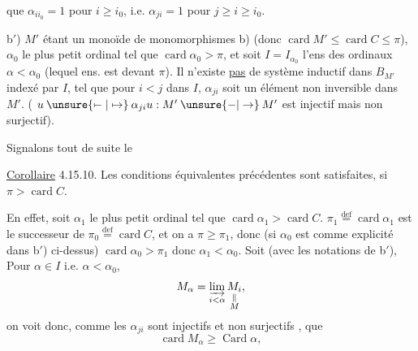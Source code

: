 
que $\alpha_{ii_0}=1$ pour $i\geq i_0$, i.e. $\alpha_{ji}=1$ pour $j\geq i\geq i_0$.

b$'$) $M'$ étant un monoïde de monomorphismes  b) (donc $\operatorname{card} M'\leq\operatorname{card} C\leq\pi$),   $\alpha_0$ le plus petit ordinal  tel que $\operatorname{card}\alpha_0>\pi$, et soit $I=I_{\alpha_0}$ l'ens  des ordinaux $\alpha<\alpha_0$ (lequel ens. est  devant $\pi$).
 Il n'existe \uline{pas} de système inductif dans $B_{M'}$ indexé par $I$, tel que  pour $i<j$ dans $I$, $\alpha_{ji}$ soit un élément non inversible dans $M'$.
( $u\mathbin{\unsure{\mapstochar\relbar|\mapsto}}\alpha_{ji}u:M'\mathbin{\unsure{-|\to}}M'$ est injectif mais non surjectif).

Signalons tout de suite le 

\uline{Corollaire} 4.15.10. Les conditions équivalentes précédentes sont satisfaites, si $\pi>\operatorname{card} C$.

En effet, soit $\alpha_1$ le  plus petit ordinal tel que $\operatorname{card}\alpha_1>\operatorname{card} C$.   $\pi_1\overset{\mathrm{def}}{=}\operatorname{card}\alpha_1$  est le successeur de $\pi_0\overset{\mathrm{def}}{=}\operatorname{card} C$, et on a $\pi\geq\pi_1$, donc  (si $\alpha_0$ est comme
explicité dans b$'$) ci-dessus) $\operatorname{card}\alpha_0>\pi_1$ donc $\alpha_1<\alpha_0$. Soit  (avec les notations de b$'$),  Pour $\alpha\in I$ i.e. $\alpha<\alpha_0$, 
\[
M_\alpha=\underset{i<\alpha}{\varinjlim}\,\underset{\substack{\Vert\\M}}{M_i},
\]
on voit donc,  comme les $\alpha_{ji}$ sont injectifs et non surjectifs , que
\[
\operatorname{card} M_\alpha\geq\operatorname{Card}\alpha,
\]

